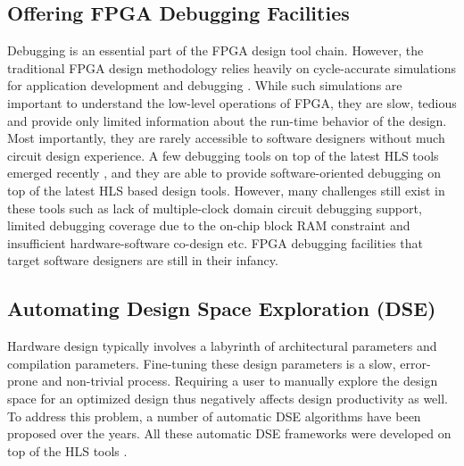 \subsection{Offering FPGA Debugging Facilities}
Debugging is an essential part of the FPGA design tool chain. However, the traditional FPGA design methodology relies heavily on cycle-accurate simulations for application development and debugging \cite{chipscope, signaltap, certus}. While such simulations are important to understand the low-level operations of FPGA, they are slow, tedious and provide only limited information about the run-time behavior of the design. Most importantly, they are rarely accessible to software designers without much circuit design experience. A few debugging tools on top of the latest HLS tools emerged recently \cite{hung2014accelerating, hung2014incremental, panjkov2015hybrid, goeders2014effective}, and they are able to provide software-oriented debugging on top of the latest HLS based design tools. However, many challenges still exist in these tools such as lack of multiple-clock domain circuit debugging support, limited debugging coverage due to the on-chip block RAM constraint and insufficient hardware-software co-design etc. FPGA debugging facilities that target software designers are still in their infancy. 

\subsection{Automating Design Space Exploration (DSE)}
Hardware design typically involves a labyrinth of architectural parameters and compilation parameters. Fine-tuning these design parameters is a slow, error-prone and non-trivial process. Requiring a user to manually explore the design space for an optimized design thus negatively affects design productivity as well. To address this problem, a number of automatic DSE algorithms have been proposed over the years. All these automatic DSE frameworks were developed on top of the HLS tools \cite{zhong2014design, schafer2012machine, holzer2007design, schafer2012divide, liu2013learning, kurek2014automating}.
 
